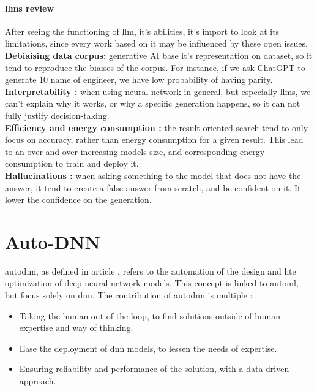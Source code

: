 \paragraph{\glspl{llm} review}
After seeing the functioning of \acrshort{llm}, it's abilities, it's import to look at its limitations, since every work based on it may be influenced by these open issues.\\
\textbf{Debiaising data corpus:} generative AI base it's representation on dataset, so it tend to reproduce the biaises of the corpus. For instance, if we ask ChatGPT to generate 10 name of engineer, we have low probability of having parity.\\
\textbf{Interpretability :} when using neural network in general, but especially \glspl{llm}, we can't explain why it works, or why a specific generation happens, so it can not fully justify decision-taking.\\
\textbf{Efficiency and energy consumption :} the result-oriented search tend to only focus on accuracy, rather than energy consumption for a given result. This lead to an over and over increasing models size, and corresponding energy consumption to train and deploy it.\\
\textbf{Hallucinations\cite{bang_multitask_2023} :} when asking something to the model that does not have the answer, it tend to create a false answer from scratch, and be confident on it. It lower the confidence on the generation. 


\section{Auto-DNN}
\label{sec:autodnn}
\acrfull{autodnn}, as defined in article \cite{talbi_automated_2021}, refers to the automation of the design and hte optimization of deep neural network models. This concept is linked to \acrfull{automl}, but focus solely on \acrshort{dnn}. The contribution of \acrshort{autodnn} is multiple : 
\begin{itemize}
    \item Taking the human out of the loop, to find solutions outside of human expertise and way of thinking.
    \item Ease the deployment of \acrshort{dnn} models, to lessen the needs of expertise.
    \item Ensuring reliability and performance of the solution, with a data-driven approach.
\end{itemize}

